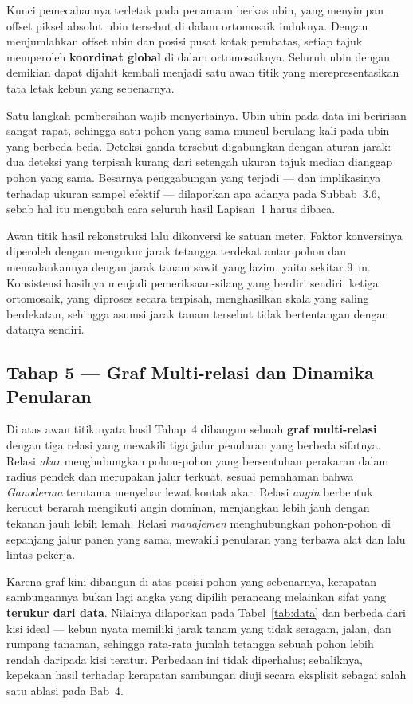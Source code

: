 Kunci pemecahannya terletak pada penamaan berkas ubin, yang menyimpan offset piksel
absolut ubin tersebut di dalam ortomosaik induknya. Dengan menjumlahkan offset ubin dan
posisi pusat kotak pembatas, setiap tajuk memperoleh \textbf{koordinat global} di dalam
ortomosaiknya. Seluruh ubin dengan demikian dapat dijahit kembali menjadi satu awan
titik yang merepresentasikan tata letak kebun yang sebenarnya.

Satu langkah pembersihan wajib menyertainya. Ubin-ubin pada data ini beririsan sangat
rapat, sehingga satu pohon yang sama muncul berulang kali pada ubin yang berbeda-beda.
Deteksi ganda tersebut digabungkan dengan aturan jarak: dua deteksi yang terpisah kurang
dari setengah ukuran tajuk median dianggap pohon yang sama. Besarnya penggabungan yang
terjadi --- dan implikasinya terhadap ukuran sampel efektif --- dilaporkan apa adanya
pada Subbab~3.6, sebab hal itu mengubah cara seluruh hasil Lapisan~1 harus dibaca.

Awan titik hasil rekonstruksi lalu dikonversi ke satuan meter. Faktor konversinya
diperoleh dengan mengukur jarak tetangga terdekat antar pohon dan memadankannya dengan
jarak tanam sawit yang lazim, yaitu sekitar 9~m. Konsistensi hasilnya menjadi
pemeriksaan-silang yang berdiri sendiri: ketiga ortomosaik, yang diproses secara
terpisah, menghasilkan skala yang saling berdekatan, sehingga asumsi jarak tanam
tersebut tidak bertentangan dengan datanya sendiri.

\subsection{Tahap 5 --- Graf Multi-relasi dan Dinamika Penularan}

Di atas awan titik nyata hasil Tahap~4 dibangun sebuah \textbf{graf multi-relasi} dengan
tiga relasi yang mewakili tiga jalur penularan yang berbeda sifatnya. Relasi
\textit{akar} menghubungkan pohon-pohon yang bersentuhan perakaran dalam radius pendek
dan merupakan jalur terkuat, sesuai pemahaman bahwa \textit{Ganoderma} terutama menyebar
lewat kontak akar. Relasi \textit{angin} berbentuk kerucut berarah mengikuti angin
dominan, menjangkau lebih jauh dengan tekanan jauh lebih lemah. Relasi
\textit{manajemen} menghubungkan pohon-pohon di sepanjang jalur panen yang sama, mewakili
penularan yang terbawa alat dan lalu lintas pekerja.

Karena graf kini dibangun di atas posisi pohon yang sebenarnya, kerapatan sambungannya
bukan lagi angka yang dipilih perancang melainkan sifat yang \textbf{terukur dari data}.
Nilainya dilaporkan pada Tabel~\ref{tab:data} dan berbeda dari kisi ideal --- kebun nyata
memiliki jarak tanam yang tidak seragam, jalan, dan rumpang tanaman, sehingga rata-rata
jumlah tetangga sebuah pohon lebih rendah daripada kisi teratur. Perbedaan ini tidak
diperhalus; sebaliknya, kepekaan hasil terhadap kerapatan sambungan diuji secara
eksplisit sebagai salah satu ablasi pada Bab~4.

